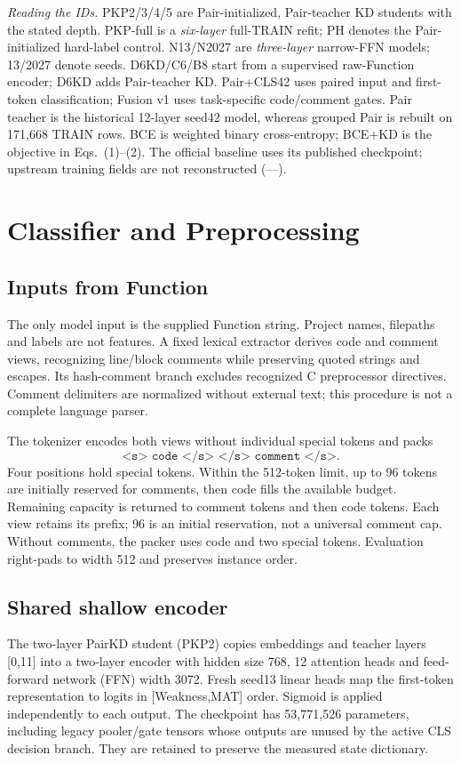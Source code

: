 \documentclass[10pt,conference]{IEEEtran}
\begin{document}
\begin{table}[t]
\smallskip
\begin{minipage}{\textwidth}
\footnotesize
\textit{Reading the IDs.}
PKP2/3/4/5 are Pair-initialized, Pair-teacher KD students with the stated depth.
PKP-full is a \emph{six-layer} full-TRAIN refit; PH denotes the Pair-initialized hard-label control.
N13/N2027 are \emph{three-layer} narrow-FFN models; 13/2027 denote seeds.
D6KD/C6/B8 start from a supervised raw-Function encoder; D6KD adds Pair-teacher KD.
Pair+CLS42 uses paired input and first-token classification; Fusion v1 uses task-specific code/comment gates.
Pair teacher is the historical 12-layer seed42 model, whereas grouped Pair is rebuilt on 171,668 TRAIN rows.
BCE is weighted binary cross-entropy; BCE+KD is the objective in Eqs.~(1)--(2).
The official baseline uses its published checkpoint; upstream training fields are not reconstructed (---).
\end{minipage}
\end{table}

\section{Classifier and Preprocessing}
\subsection{Inputs from Function}
The only model input is the supplied Function string. Project names, filepaths and labels are not features. A fixed lexical extractor derives code and comment views, recognizing line/block comments while preserving quoted strings and escapes. Its hash-comment branch excludes recognized C preprocessor directives. Comment delimiters are normalized without external text; this procedure is not a complete language parser.

The tokenizer encodes both views without individual special tokens and packs
\[
 \texttt{<s> code </s> </s> comment </s>}.
\]
Four positions hold special tokens. Within the 512-token limit, up to 96 tokens are initially reserved for comments, then code fills the available budget. Remaining capacity is returned to comment tokens and then code tokens. Each view retains its prefix; 96 is an initial reservation, not a universal comment cap. Without comments, the packer uses code and two special tokens. Evaluation right-pads to width 512 and preserves instance order.

\subsection{Shared shallow encoder}
The two-layer PairKD student (PKP2) copies embeddings and teacher layers [0,11] into a two-layer encoder with hidden size 768, 12 attention heads and feed-forward network (FFN) width 3072. Fresh seed13 linear heads map the first-token representation to logits in [Weakness,MAT] order. Sigmoid is applied independently to each output. The checkpoint has 53,771,526 parameters, including legacy pooler/gate tensors whose outputs are unused by the active CLS decision branch. They are retained to preserve the measured state dictionary.
\end{document}
